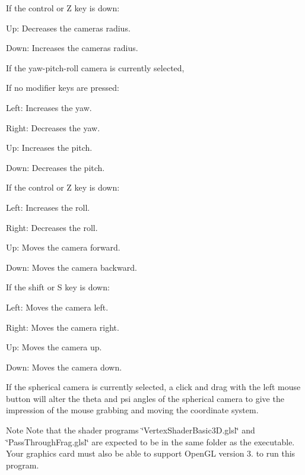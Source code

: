 If the control or Z key is down\+:


\begin{DoxyItemize}
\item Up\+: Decreases the camera\textquotesingle{}s radius.
\item Down\+: Increases the camera\textquotesingle{}s radius.
\end{DoxyItemize}

If the yaw-\/pitch-\/roll camera is currently selected,

If no modifier keys are pressed\+:


\begin{DoxyItemize}
\item Left\+: Increases the yaw.
\item Right\+: Decreases the yaw.
\item Up\+: Increases the pitch.
\item Down\+: Decreases the pitch.
\end{DoxyItemize}

If the control or Z key is down\+:


\begin{DoxyItemize}
\item Left\+: Increases the roll.
\item Right\+: Decreases the roll.
\item Up\+: Moves the camera forward.
\item Down\+: Moves the camera backward.
\end{DoxyItemize}

If the shift or S key is down\+:


\begin{DoxyItemize}
\item Left\+: Moves the camera left.
\item Right\+: Moves the camera right.
\item Up\+: Moves the camera up.
\item Down\+: Moves the camera down.
\end{DoxyItemize}

If the spherical camera is currently selected, a click and drag with the left mouse button will alter the theta and psi angles of the spherical camera to give the impression of the mouse grabbing and moving the coordinate system.

\begin{DoxyNote}{Note}
Note that the shader programs \char`\"{}\+Vertex\+Shader\+Basic3\+D.\+glsl\char`\"{} and \char`\"{}\+Pass\+Through\+Frag.\+glsl\char`\"{} are expected to be in the same folder as the executable. Your graphics card must also be able to support Open\+GL version 3. to run this program.
\end{DoxyNote}


